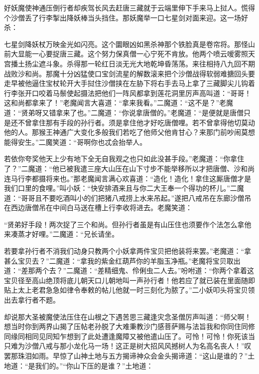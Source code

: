 \documentclass[12pt,UTF8]{ctexbook}
\begin{document}
好妖魔使神通压倒行者却疾驾长风去赶唐三藏就于云端里伸下手来马上挝人。慌得个沙僧丢了行李掣出降妖棒当头挡住。那妖魔举一口七星剑对面来迎。这一场好杀：

七星剑降妖杖万映金光如闪亮。这个圜眼凶如黑杀神那个铁脸真是卷帘将。那怪山前大显能一心要捉唐三藏。这个努力保真僧一心宁死不肯放。他两个喷云嗳雾照天宫播土扬尘遮斗象。杀得那一轮红日淡无光大地乾坤昏荡荡。来往相持八九回不期战败沙和尚。那魔十分凶猛使口宝剑流星的解数滚来把个沙僧战得软弱难搪回头要走早被他逼住宝杖轮开大手挝住沙僧挟在左胁下将右手去马上拿了三藏脚尖儿钩着行李张开口咬着马鬃使起摄法把他们一阵风都拿到莲花洞里厉声高叫道：“哥哥！这和尚都拿来了！”老魔闻言大喜道：“拿来我看。”二魔道：“这不是？”老魔道：“贤弟呀又错拿来了也。”二魔道：“你说拿唐僧的。”老魔道：“是便就是唐僧只是还不曾拿住那有手段的孙行者。须是拿住他才好吃唐僧哩。若不曾拿得他切莫动他的人。那猴王神通广大变化多般我们若吃了他师父他肯甘心？来那门前吵闹莫想能得安生。”二魔笑道：“哥啊你也忒会抬举人。

若依你夸奖他天上少有地下全无自我观之也只如此没甚手段。”老魔道：“你拿住了？”二魔道：“他已被我遣三座大山压在山下寸步不能举移所以才把唐僧、沙和尚连马行李都摄将来也。”那老魔闻言满心欢喜道：“造化！造化！拿住这厮唐僧才是我们口里的食哩。”叫小妖：“快安排酒来且与你二大王奉一个得功的杯儿。”二魔道：“哥哥且不要吃酒叫小的们把猪八戒捞上水来吊起。”遂把八戒吊在东廊沙僧吊在西边唐僧吊在中间白马送在槽上行李收将进去。老魔笑道：

“贤弟好手段！两次捉了三个和尚。但孙行者虽是有山压住也须要作个法怎么拿他来凑蒸才好哩。”二魔道：“兄长请坐。

若要拿孙行者不消我们动身只教两个小妖拿两件宝贝把他装将来罢。”老魔道：“拿甚么宝贝去？”二魔道：“拿我的紫金红葫芦你的羊脂玉净瓶。”老魔将宝贝取出道：“差那两个去？”二魔道：“差精细鬼、伶俐虫二人去。”吩咐道：“你两个拿着这宝贝径至高山绝顶将底儿朝天口儿朝地叫一声孙行者！他若应了就已装在里面随即贴上太上老君急急如律令奉敕的帖儿他就一时三刻化为脓了。”二小妖叩头将宝贝领出去拿行者不题。

却说那大圣被魔使法压住在山根之下遇苦思三藏逢灾念圣僧厉声叫道：“师父啊！想当时你到两界山揭了压帖老孙脱了大难秉教沙门感菩萨赐与法旨我和你同住同修同缘同相同见同知乍想到了此处遭逢魔障又被他遣山压了。可怜！可怜！你死该当只难为沙僧八戒与那小龙化马一场！这正是树大招风风撼树人为名高名丧人！”叹罢那珠泪如雨。早惊了山神土地与五方揭谛神众会金头揭谛道：“这山是谁的？”土地道：“是我们的。”“你山下压的是谁？”土地道：
\end{document}
